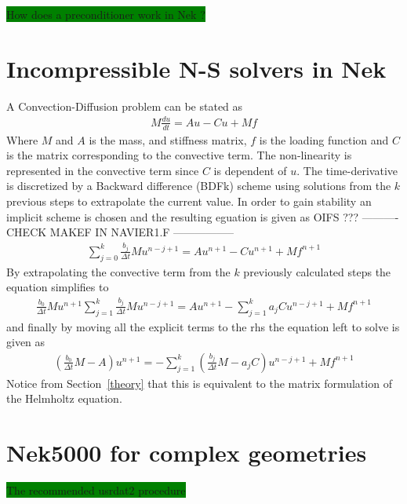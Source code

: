 \colorbox{green}{How does a preconditioner work in Nek ?}

%
\section{Incompressible N-S solvers in Nek}
A Convection-Diffusion problem can be stated as 
\begin{align}
    M\frac{du}{dt} = Au-Cu+Mf
    \label{eq:conv-diff}
\end{align}
% 
Where $M$ and $A$ is the mass, and stiffness matrix, $f$ is the loading function and $C$ is 
the matrix corresponding to the convective term. The non-linearity is represented in the 
convective term since $C$ is dependent of $u$.
The time-derivative is discretized by a Backward difference (BDFk) scheme using solutions 
from the $k$ previous steps to extrapolate the current value. In order to gain stability 
an implicit scheme is chosen and the resulting eguation is given as 
%
OIFS ???
---------- CHECK MAKEF IN NAVIER1.F ----------------- 
\begin{align}
    \sum_{j=0}^{k}\frac{b_j}{\Delta t}Mu^{n-j+1} = Au^{n+1}-Cu^{n+1}+Mf^{n+1}
    \label{eq:conv-diff2}
\end{align}
% 
By extrapolating the convective term from the $k$ previously calculated steps the equation 
simplifies to 
%
\begin{align}
   \frac{b_0}{\Delta t}Mu^{n+1} \sum_{j=1}^{k}\frac{b_j}{\Delta t}Mu^{n-j+1} 
   = Au^{n+1}-\sum_{j=1}^{k}a_jCu^{n-j+1}+Mf^{n+1}
    \label{eq:conv-diff3}
\end{align}
% 
and finally by moving all the explicit terms to the rhs the equation left to solve is given as 
%
\begin{align}
   (\frac{b_0}{\Delta t}M-A)u^{n+1} 
   = -\sum_{j=1}^{k}(\frac{b_j}{\Delta t}M-a_jC)u^{n-j+1}+Mf^{n+1}
    \label{eq:conv-diff4}
\end{align}
% 
Notice from Section~\ref{theory} that this is equivalent to the matrix formulation of 
the Helmholtz equation.



\section{Nek5000 for complex geometries}
\colorbox{green}{The recommended usrdat2 procedure}

